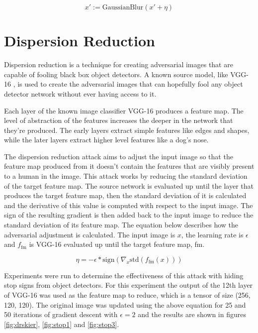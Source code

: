 \documentclass{article}
\begin{document}
\begin{equation}
    x' := \text{GaussianBlur}(x' + \eta)
\end{equation}

\section{Dispersion Reduction}
Dispersion reduction \cite{Lu_2020_CVPR} is a technique for creating adversarial images that are capable of fooling black box object detectors. A known source model, like VGG-16 \cite{simonyan2015deep}, is used to create the adversarial images that can hopefully fool any object detector network without ever having access to it.

Each layer of the known image classifier  VGG-16 produces a feature map. The level of abstraction of the features increases the deeper in the network that they're produced. The early layers extract simple features like edges and shapes, while the later layers extract higher level features like a dog's nose. \cite{olah2017feature}

The dispersion reduction attack aims to adjust the input image so that the feature map produced from it doesn't contain the features that are visibly present to a human in the image. This attack works by reducing the standard deviation of the target feature map. The source network is evaluated up until the layer that produces the target feature map, then the standard deviation of it is calculated and the derivative of this value is computed with respect to the input image. The sign of the resulting gradient is then added back to the input image to reduce the standard deviation of its feature map. The equation below describes how the adversarial adjustment is calculated. The input image is $x$, the learning rate is $\epsilon$ and $f_{\text{fm}}$ is VGG-16 evaluated up until the target feature map, fm.

\begin{equation}
    \eta = - \epsilon * \text{sign}(\nabla_x \text{std}(f_{\text{fm}}(x)))
\end{equation}

Experiments were run to determine the effectiveness of this attack with hiding stop signs from object detectors. For this experiment the output of the 12th layer of VGG-16 was used as the feature map to reduce, which is a tensor of size (256, 120, 120). The original image was updated using the above equation for 25 and 50 iterations of gradient descent with $\epsilon = 2$ and the results are shown in figures \ref{fig:drskier}, \ref{fig:stop1} and \ref{fig:stop3}.
\end{document}
